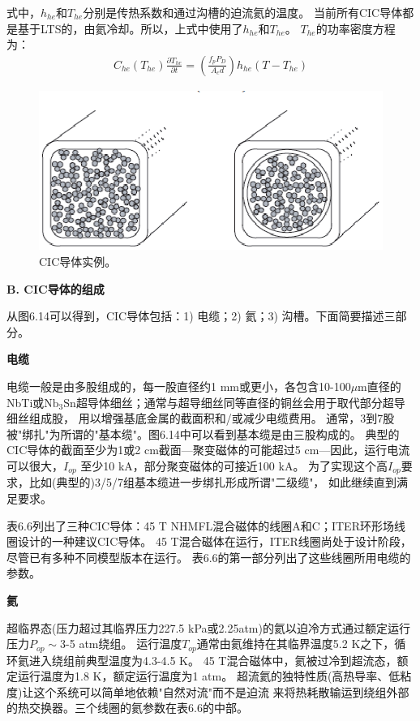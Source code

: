 式中，$h_{he}$和$T_{he}$分别是传热系数和通过沟槽的迫流氦的温度。
当前所有CIC导体都是基于LTS的，由氦冷却。所以，上式中使用了$h_{he}$和$T_{he}$。
$T_{he}$的功率密度方程为：
\begin{align*}%
C_{he}(T_{he})\frac{\partial T_{he}}{\partial t}=(\frac{f_{p}P_D}{A_cd})h_{he}(T-T_{he})
\end{align*}

\begin{figure}[htbp]
	\centering
	\includegraphics[scale=0.7]{chpt6/figs/fig6.14.eps}
	\caption{CIC导体实例。}
\end{figure}

\textbf{B. CIC导体的组成}

从图6.14可以得到，CIC导体包括：1) 电缆；2) 氦；3) 沟槽。下面简要描述三部分。

\textbf{电缆}

电缆一般是由多股组成的，每一股直径约1 mm或更小，各包含10-100$\mu$m直径的
NbTi或$\mathrm{Nb_3Sn}$超导体细丝；通常与超导细丝同等直径的铜丝会用于取代部分超导细丝组成股，
用以增强基底金属的截面积和/或减少电缆费用。
通常，3到7股被"绑扎"为所谓的"基本缆"。图6.14中可以看到基本缆是由三股构成的。
典型的CIC导体的截面至少为1或2 cm截面---聚变磁体的可能超过5 cm---因此，运行电流可以很大，$I_{op}$
至少10 kA，部分聚变磁体的可接近100 kA。
为了实现这个高$I_{op}$要求，比如(典型的)3/5/7组基本缆进一步绑扎形成所谓"二级缆"，
如此继续直到满足要求。

表6.6列出了三种CIC导体：45 T NHMFL混合磁体的线圈A和C；ITER环形场线圈设计的一种建议CIC导体。
45 T混合磁体在运行，ITER线圈尚处于设计阶段，尽管已有多种不同模型版本在运行。
表6.6的第一部分列出了这些线圈所用电缆的参数。

\textbf{氦}

超临界态(压力超过其临界压力227.5 kPa或2.25atm)的氦以迫冷方式通过额定运行压力$P_{op}\sim$3-5 atm绕组。
运行温度$T_{op}$通常由氦维持在其临界温度5.2 K之下，循环氦进入绕组前典型温度为4.3-4.5 K。
45 T混合磁体中，氦被过冷到超流态，额定运行温度为1.8 K，额定运行温度为1 atm。
超流氦的独特性质(高热导率、低粘度)让这个系统可以简单地依赖"自然对流"而不是迫流
来将热耗散输运到绕组外部的热交换器。三个线圈的氦参数在表6.6的中部。

